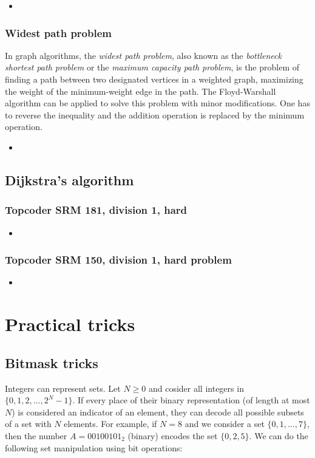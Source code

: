 \documentclass[a4paper, twoside,openany]{book}
\newcommand{\insertcode}[2]{\begin{itemize}\item[]\end{itemize}} %
\begin{document}
\insertcode{"codes/floyd_warshall_reconstruct.cpp"}{A C++ code for the Floyd-Warshall algorithm with information about the minimal path.} 

\subsection{Widest path problem}
In graph algorithms, the \emph{widest path problem}, also known as the \emph{bottleneck shortest path problem} or the \emph{maximum capacity path problem}, is the problem of finding a path between two designated vertices in a weighted graph, maximizing the weight of the minimum-weight edge in the path.
The Floyd-Warshall algorithm can be applied to solve this problem with minor modifications.
One has to reverse the inequality and the addition operation is replaced by the minimum operation.

\insertcode{"codes/floyd_warshall_routing.cpp"}{A C++ code for the Floyd-Warshall algorithm used for optimal routing in a constrained network.} 


\section{Dijkstra's algorithm}

\subsection{Topcoder SRM 181, division 1, hard}

\insertcode{"codes/Dijkstra_SRM181div1hard.cpp"}{todo}

\subsection{Topcoder SRM 150, division 1, hard problem}

\insertcode{"codes/Dijkstra_SRM150div1hard.cpp"}{todo}

\chapter{Practical tricks}

\section{Bitmask tricks}

Integers can represent sets. Let $N \geq 0$ and cosider all integers in $\{ 0, 1, 2, \ldots, 2^N-1 \}$. If every place of their binary representation (of length at most $N$) is considered an indicator of an element, they can decode all possible subsets of a set with $N$ elements. For example, if $N=8$ and we consider a set $\{ 0, 1, \ldots, 7\}$, then the number $A=00100101_2$ (binary) encodes the set $\{ 0, 2, 5 \}$. We can do the following set manipulation using bit operations:
\end{document}
